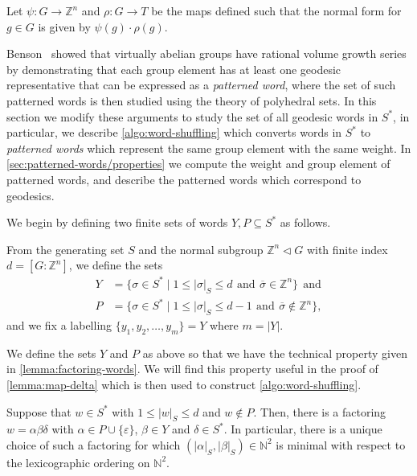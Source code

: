 \begin{definition}\label{defn:phi-rho}
	Let $\psi\colon G \to \mathbb{Z}^n$ and $\rho\colon G \to T$ be the maps defined such that the normal form for $g \in G$ is given by $\psi(g) \cdot \rho(g)$.
\end{definition}

Benson~\cite{benson1983} showed that virtually abelian groups have rational volume growth series by demonstrating that each group element has at least one geodesic representative that can be expressed as a \emph{patterned word}, where the set of such patterned words is then studied using the theory of polyhedral sets.
In this section we modify these arguments to study the set of all geodesic words in $S^*$, in particular, we describe \cref{algo:word-shuffling} which converts words in $S^*$ to \emph{patterned words} which represent the same group element with the same weight.
In \cref{sec:patterned-words/properties} we compute the weight and group element of patterned words, and describe the patterned words which correspond to geodesics.

We begin by defining two finite sets of words $Y,P \subseteq S^*$ as follows.

\begin{definition}\label{defn:sets-Y-P}
	From the generating set $S$ and the normal subgroup $\mathbb{Z}^n \triangleleft G$ with finite index $d = [G : \mathbb{Z}^n]$, we define the sets
	\begin{align*}
		Y
		&=
			\{
				\sigma \in S^*
			\mid
				1 \leqslant |\sigma|_S \leqslant d
				\ \,\mathrm{and}\,\ 
				\overline{\sigma} \in \mathbb{Z}^n
			\}
		\ \ \text{and}
		\\
		P
		&=
		\{
				\sigma \in S^*
			\mid
				1 \leqslant |\sigma|_S \leqslant d - 1
				\ \,\mathrm{and}\,\ 
				\overline{\sigma} \notin \mathbb{Z}^n
			\},
	\end{align*}
	and we fix a labelling $\{y_1,y_2,\ldots,y_m\} = Y$ where $m = |Y|$.
\end{definition}

We define the sets $Y$ and $P$ as above so that we have the technical property given in \cref{lemma:factoring-words}.
We will find this property useful in the proof of \cref{lemma:map-delta} which is then used to construct \cref{algo:word-shuffling}.

\begin{lemma}\label{lemma:factoring-words}
	Suppose that $w \in S^*$ with $1 \leqslant |w|_S \leqslant d$ and $w \notin P$.
	Then, there is a factoring $w = \alpha \beta \delta$ with $\alpha \in P \cup \{ \varepsilon \}$, $\beta \in Y$ and $\delta \in S^*$.
	In particular, there is a unique choice of such a factoring for which $(|\alpha|_S, |\beta|_S) \in \mathbb{N}^2$ is minimal with respect to the lexicographic ordering on $\mathbb{N}^2$.
\end{lemma}


